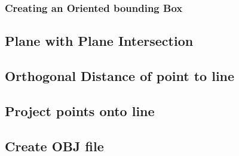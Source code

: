 			\subsubsection{Creating an Oriented bounding Box}

				
		\subsection{Plane with Plane Intersection}
		
		\subsection{Orthogonal Distance of point to line}
		
		\subsection{Project points onto line}
		
		\subsection{Create OBJ file}

	


